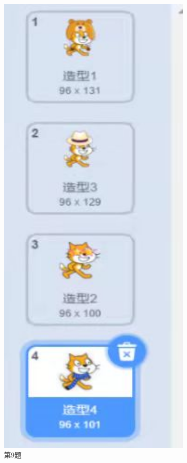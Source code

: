 \documentclass[10pt, a4paper]{article}
\begin{document}
\begin{enumerate}
\begin{figure}[htbp]
\begin{minipage}[t]{.1\textwidth}
                \includegraphics[width=0.85\textwidth]{9.jpg}
                \caption*{第9题}
            \end{minipage}

\end{figure}
\end{enumerate}
\end{document}
